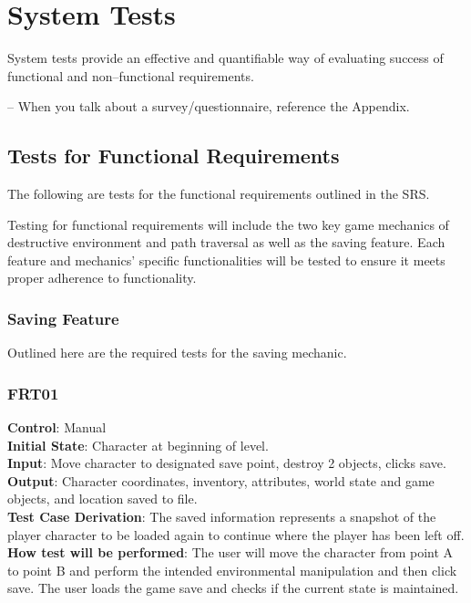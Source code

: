 \documentclass[12pt, titlepage]{article}
\begin{document}
\section{System Tests}

System tests provide an effective and quantifiable way of evaluating success of functional and non--functional requirements.

-- When you talk about a survey/questionnaire, reference the Appendix.

\subsection{Tests for Functional Requirements}

The following are tests for the functional requirements outlined in the SRS.

Testing for functional requirements will include the two key game mechanics of destructive environment and path traversal as well as the saving feature. Each feature and mechanics’ specific functionalities will be tested to ensure it meets proper adherence to functionality.

\subsubsection{Saving Feature}

Outlined here are the required tests for the saving mechanic.

\subsubsection{FRT01}

\textbf{Control}: Manual\\
\textbf{Initial State}: Character at beginning of level.\\
\textbf{Input}: Move character to designated save point, destroy 2 objects, clicks save.\\
\textbf{Output}: Character coordinates, inventory, attributes, world state and game objects, and location saved to file.\\
\textbf{Test Case Derivation}: The saved information represents a snapshot of the player character to be loaded again to continue where the player has been left off.\\
\textbf{How test will be performed}: The user will move the character from point A to point B and perform the intended environmental manipulation and then click save.  The user loads the game save and checks if the current state is maintained.\\
\end{document}
